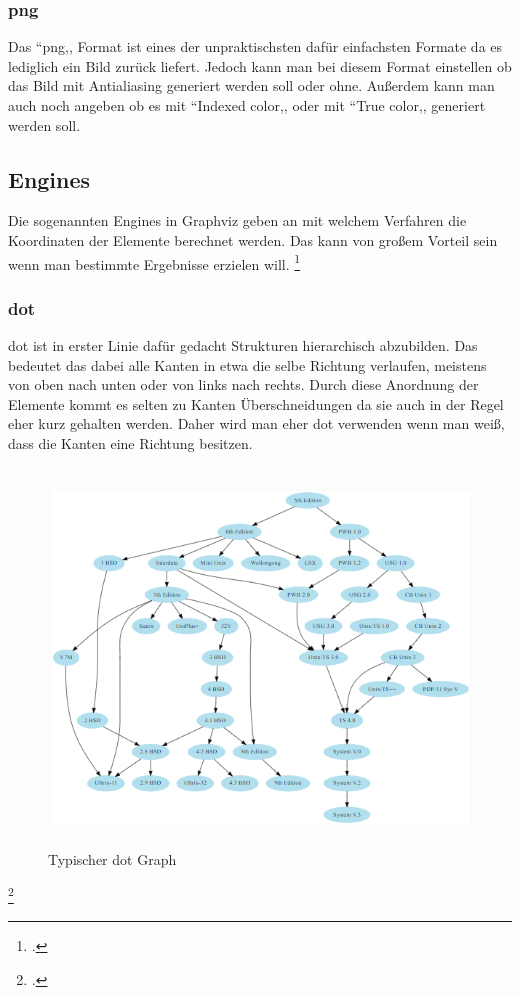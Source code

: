 \subsubsection{png}
\noindent
Das ``png,, Format ist eines der unpraktischsten dafür einfachsten Formate da es lediglich ein Bild zurück liefert.
Jedoch kann man bei diesem Format einstellen ob das Bild mit Antialiasing generiert werden soll oder ohne. Außerdem kann man auch noch angeben ob es mit ``Indexed color,, oder mit ``True color,, generiert werden soll. 

\newpage
\subsection{Engines}
\fib{}
\noindent
Die sogenannten Engines in Graphviz geben an mit welchem Verfahren die Koordinaten der Elemente berechnet werden. Das kann von großem Vorteil sein wenn man bestimmte Ergebnisse erzielen will.
\footcite{noauthor_documentation_nodate}

\subsubsection{dot}

\noindent
dot ist in erster Linie dafür gedacht Strukturen hierarchisch abzubilden. Das bedeutet das dabei alle Kanten in etwa die selbe Richtung verlaufen, meistens von oben nach unten oder von links nach rechts. Durch diese Anordnung der Elemente kommt es selten zu Kanten Überschneidungen da sie auch in der Regel eher kurz gehalten werden.
Daher wird man eher dot verwenden wenn man weiß, dass die Kanten eine Richtung besitzen.

\begin{figure}[H]
	\begin{center}
		\includegraphics[width=16cm, height=10cm]{images/dot.png}
		\caption{Typischer dot Graph}
		\label{dot}
	\end{center}
\end{figure}
\footcite{noauthor_graphics_nodate}
\newpage
\noindent
